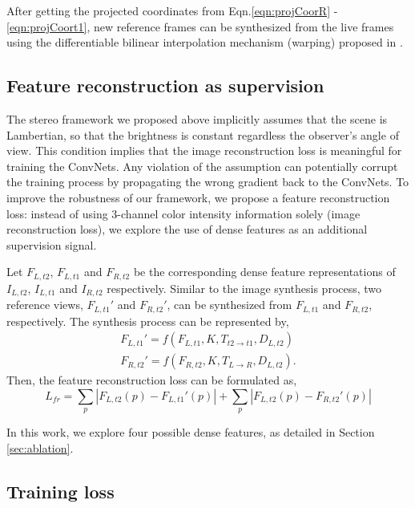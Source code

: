 \documentclass[10pt,twocolumn,letterpaper]{article}
\begin{document}
After getting the projected coordinates from Eqn.\ref{eqn:projCoorR} - \ref{eqn:projCoort1}, new reference frames can be synthesized from the live frames using the differentiable bilinear interpolation mechanism (warping) proposed in \cite{jaderberg2015stn}. 

\subsection{Feature reconstruction as supervision}\label{sec:method_featSuper}
The stereo framework we proposed above implicitly assumes that the scene is Lambertian, so that the brightness is constant regardless the observer's angle of view. This condition implies that the image reconstruction loss is meaningful for training the ConvNets.
Any violation of the assumption can potentially corrupt the training process by propagating the wrong gradient back to the ConvNets. 
To improve the robustness of our framework, we propose a feature reconstruction loss: 
instead of using 3-channel color intensity information solely (image reconstruction loss), we explore the use of dense features as an additional supervision signal. 


Let $F_{L,t2}$, $F_{L,t1}$ and $F_{R,t2}$ be the corresponding dense feature representations of $I_{L,t2}$, $I_{L,t1}$ and $I_{R,t2}$ respectively. 
Similar to the image synthesis process, two reference views, $F_{L,t1}'$ and $F_{R,t2}'$, can be synthesized from $F_{L,t1}$ and $F_{R,t2}$, respectively.
The synthesis process can be represented by, 
\begin{align}
    F_{L,t1}' = f(F_{L,t1}, K, T_{t2 \rightarrow t1}, D_{L,t2}) \label{eqn:synFeat1} \\
    F_{R,t2}' = f(F_{R,t2}, K, T_{L \rightarrow R}, D_{L,t2}).
    \label{eqn:synFeat2}
\end{align}
Then, the feature reconstruction loss can be formulated as,
\begin{equation} 
    L_{fr} = \sum_{p}{|F_{L,t2}(p) - F_{L,t1}'(p)|} 
    +\sum_{p}{|F_{L,t2}(p) - F_{R,t2}'(p)|} \label{eqn:featLoss} 
\end{equation}

In this work, we explore four possible dense features, as detailed in Section \ref{sec:ablation}.


\subsection{Training loss} \label{sec:method_loss}
\end{document}
